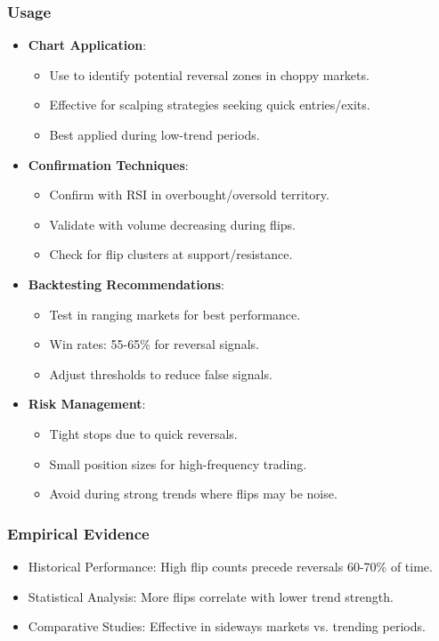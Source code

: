 \documentclass[12pt]{article}
\begin{document}
\subsubsection{Usage}
\begin{itemize}
\item \textbf{Chart Application}:
  \begin{itemize}
  \item Use to identify potential reversal zones in choppy markets.
  \item Effective for scalping strategies seeking quick entries/exits.
  \item Best applied during low-trend periods.
  \end{itemize}
\item \textbf{Confirmation Techniques}:
  \begin{itemize}
  \item Confirm with RSI in overbought/oversold territory.
  \item Validate with volume decreasing during flips.
  \item Check for flip clusters at support/resistance.
  \end{itemize}
\item \textbf{Backtesting Recommendations}:
  \begin{itemize}
  \item Test in ranging markets for best performance.
  \item Win rates: 55-65\% for reversal signals.
  \item Adjust thresholds to reduce false signals.
  \end{itemize}
\item \textbf{Risk Management}:
  \begin{itemize}
  \item Tight stops due to quick reversals.
  \item Small position sizes for high-frequency trading.
  \item Avoid during strong trends where flips may be noise.
  \end{itemize}
\end{itemize}

\subsubsection{Empirical Evidence}
\begin{itemize}
\item Historical Performance: High flip counts precede reversals 60-70\% of time.
\item Statistical Analysis: More flips correlate with lower trend strength.
\item Comparative Studies: Effective in sideways markets vs. trending periods.
\end{itemize}
\end{document}
